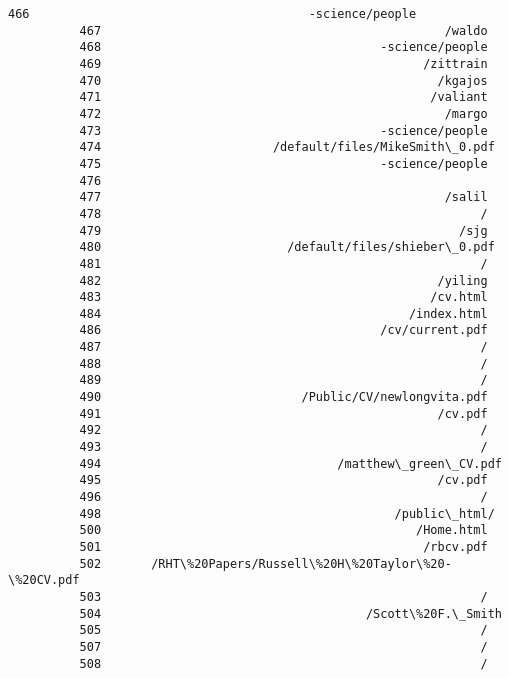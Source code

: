 \documentclass[11pt]{article}
\begin{document}
\begin{Verbatim}[commandchars=\\\{\}]
          466                                       -science/people
          467                                                /waldo
          468                                       -science/people
          469                                             /zittrain
          470                                               /kgajos
          471                                              /valiant
          472                                                /margo
          473                                       -science/people
          474                        /default/files/MikeSmith\_0.pdf
          475                                       -science/people
          476                                                      
          477                                                /salil
          478                                                     /
          479                                                  /sjg
          480                          /default/files/shieber\_0.pdf
          481                                                     /
          482                                               /yiling
          483                                              /cv.html
          484                                           /index.html
          486                                       /cv/current.pdf
          487                                                     /
          488                                                     /
          489                                                     /
          490                            /Public/CV/newlongvita.pdf
          491                                               /cv.pdf
          492                                                     /
          493                                                     /
          494                                 /matthew\_green\_CV.pdf
          495                                               /cv.pdf
          496                                                     /
          498                                         /public\_html/
          500                                            /Home.html
          501                                             /rbcv.pdf
          502       /RHT\%20Papers/Russell\%20H\%20Taylor\%20-\%20CV.pdf
          503                                                     /
          504                                     /Scott\%20F.\_Smith
          505                                                     /
          507                                                     /
          508                                                     /

\end{Verbatim}
\end{document}

